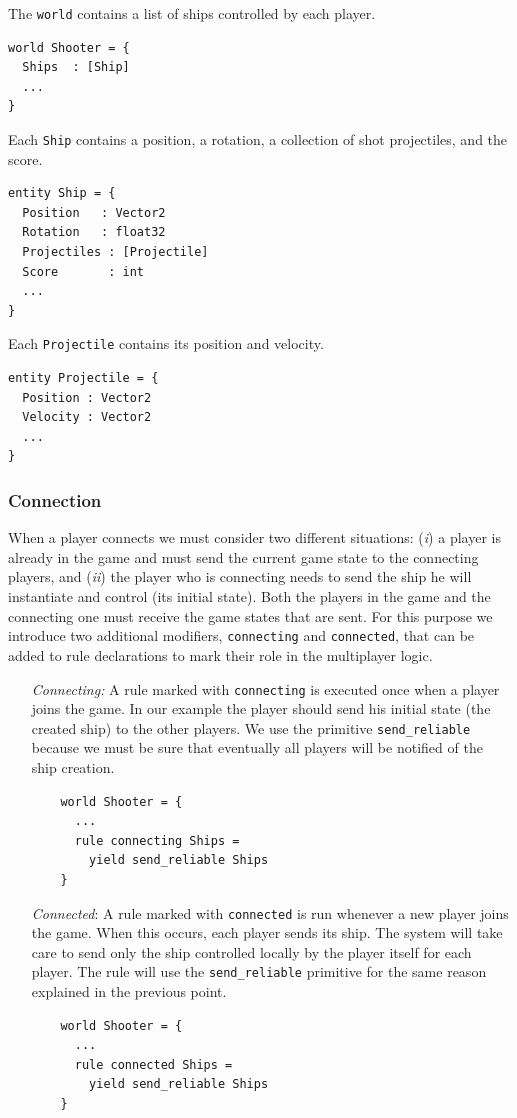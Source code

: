 The \texttt{world} contains a list of ships controlled by each player.
\begin{lstlisting}
world Shooter = {
  Ships  : [Ship]
  ...
}
\end{lstlisting}

Each \texttt{Ship} contains a position, a rotation, a collection of shot projectiles, and the score.
\begin{lstlisting}
entity Ship = {
  Position   : Vector2
  Rotation   : float32
  Projectiles : [Projectile]
  Score		  : int
  ...
}

\end{lstlisting}

Each \texttt{Projectile} contains its position and velocity.

\begin{lstlisting}
entity Projectile = {
  Position : Vector2
  Velocity : Vector2
  ...
}
\end{lstlisting}

\subsubsection*{Connection}
When a player connects we must consider two different situations: (\textit{i}) a player is already in the game and must send the current game state to the connecting players, and (\textit{ii}) the player who is connecting needs to send the ship he will instantiate and control (its initial state). Both the players in the game and the connecting one must receive the game states that are sent. For this purpose we introduce two additional modifiers, \texttt{connecting} and \texttt{connected}, that can be added to rule declarations to mark their role in the multiplayer logic.

\begin{itemize}
	\item[\textit{Connecting:}] A rule marked with \texttt{connecting} is executed once when a player joins the game. In our example the player should send his initial state (the created ship) to the other players. We use the primitive \texttt{send\_reliable} because we must be sure that eventually all players will be notified of the ship creation.
	\begin{lstlisting}
	world Shooter = {
	  ...
	  rule connecting Ships =
        yield send_reliable Ships
	}
	\end{lstlisting}
	
	\item [\textit{Connected}:] A rule marked with \texttt{connected} is run whenever a new player joins the game. When this occurs, each player sends its ship. The system will take care to send only the ship controlled locally by the player itself for each player. The rule will use the \texttt{send\_reliable} primitive for the same reason explained in the previous point.
	\begin{lstlisting}
	world Shooter = {
	  ...
	  rule connected Ships =
        yield send_reliable Ships
	}
	\end{lstlisting}
\end{itemize}

